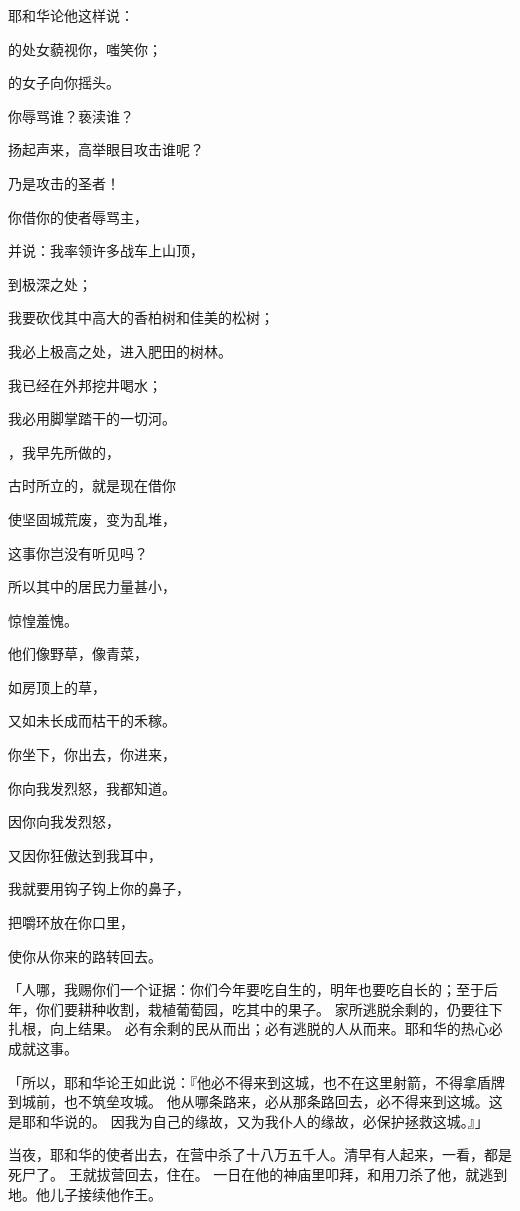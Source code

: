 {耶和华论他这样说：
\par }{的处女藐视你，嗤笑你；
\par }{的女子向你摇头。
\par }{\Q {}你辱骂谁？亵渎谁？
\par }{\Q 扬起声来，高举眼目攻击谁呢？
\par }{\Q 乃是攻击{}的圣者！
\par }{\Q {}你借你的使者辱骂主，
\par }{\Q 并说：我率领许多战车上山顶，
\par }{\Q 到{}极深之处；
\par }{\Q 我要砍伐其中高大的香柏树和佳美的松树；
\par }{\Q 我必上极高之处，进入肥田的树林。
\par }{\Q {}我已经在外邦挖井喝水；
\par }{\Q 我必用脚掌踏干{}的一切河。
\par }{\BB \par }{\Q {}，我早先所做的，
\par }{\Q 古时所立的，就是现在借你
\par }{\Q 使坚固城荒废，变为乱堆，
\par }{\Q 这事你岂没有听见吗？
\par }{\Q {}所以其中的居民力量甚小，
\par }{\Q 惊惶羞愧。
\par }{\Q 他们像野草，像青菜，
\par }{\Q 如房顶上的草，
\par }{\Q 又如未长成而枯干的禾稼。
\par }{\Q {}你坐下，你出去，你进来，
\par }{\Q 你向我发烈怒，我都知道。
\par }{\Q {}因你向我发烈怒，
\par }{\Q 又因你狂傲{}达到我耳中，
\par }{\Q 我就要用钩子钩上你的鼻子，
\par }{\Q 把嚼环放在你口里，
\par }{\Q 使你从你来的路转回去。
\par }{\PP {}「{}人哪，我赐你们一个证据：你们今年要吃自生的，明年也要吃自长的；至于后年，你们要耕种收割，栽植葡萄园，吃其中的果子。
家所逃脱余剩的，仍要往下扎根，向上结果。
必有余剩的民从{}而出；必有逃脱的人从{}而来。耶和华的热心必成就这事。
\par }{\PP {}「所以，耶和华论{}王如此说：『他必不得来到这城，也不在这里射箭，不得拿盾牌到城前，也不筑垒攻城。
他从哪条路来，必从那条路回去，必不得来到这城。这是耶和华说的。
因我为自己的缘故，又为我仆人{}的缘故，必保护拯救这城。』」
\par }{\PP {}当夜，耶和华的使者出去，在{}营中杀了十八万五千人。清早有人起来，一看，都是死尸了。
王{}就拔营回去，住在{}。
一日在他的神{}庙里叩拜，{}{}和{}用刀杀了他，就逃到{}地。他儿子{}接续他作王。

}

